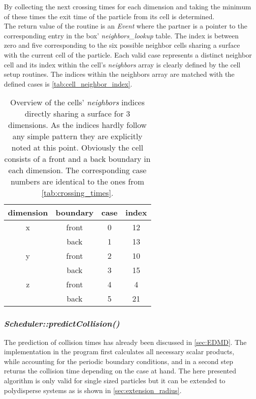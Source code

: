 By collecting the next crossing times for each dimension and taking the minimum of these times the exit time of the particle from its cell is determined.\\

The return value of the routine is an \textit{Event} where the partner is a pointer to the corresponding entry in the box' \textit{neighbors\_lookup} table. The index is between zero and five corresponding to the six possible neighbor cells sharing a surface with the current cell of the particle. Each valid case represents a distinct neighbor cell and its index within the cell's \textit{neighbors} array is clearly defined by the cell setup routines. The indices within the neighbors array are matched with the defined cases is \autoref{tab:cell_neighbor_index}. 

\begin{table}[h]
\centering
\begin{tabular}{c|c|c|c}
dimension & boundary & case & index \\ \hline
x & front & 0 & 12 \\
 & back & 1 & 13 \\ \hline
y & front & 2 & 10 \\
 & back & 3 & 15 \\ \hline
z & front & 4 & 4 \\
 & back & 5 & 21 \\
\end{tabular}
\caption[Lookup table of cell neighbor indices]{Overview of the cells' \textit{neighbors} indices directly sharing a surface for 3 dimensions. As the indices hardly follow any simple pattern they are explicitly noted at this point. Obviously the cell consists of a front and a back boundary in each dimension. The corresponding case numbers are identical to the ones from \autoref{tab:crossing_times}.}
\label{tab:cell_neighbor_index}
\end{table}

\subsubsection{\quad \textit{Scheduler::predictCollision()}}
The prediction of collision times has already been discussed in \autoref{sec:EDMD}. The implementation in the program first calculates all necessary scalar products, while accounting for the periodic boundary conditions, and in a second step returns the collision time depending on the case at hand. The here presented algorithm is only valid for single sized particles but it can be extended to polydisperse systems as is shown in \autoref{sec:extension_radius}.\\

